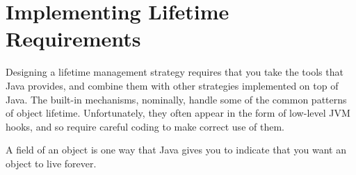 \chapter{Implementing Lifetime Requirements}

Designing a lifetime management strategy
requires that you take the tools that Java provides, and combine them
with other strategies implemented on top of Java. The built-in mechanisms,
nominally, handle some of the common patterns of object lifetime.
Unfortunately, they often appear in the form of low-level JVM hooks, and so
require careful coding to make correct use of them.  


A  field of an object is one way that Java gives you to indicate
that you want an object to live forever.